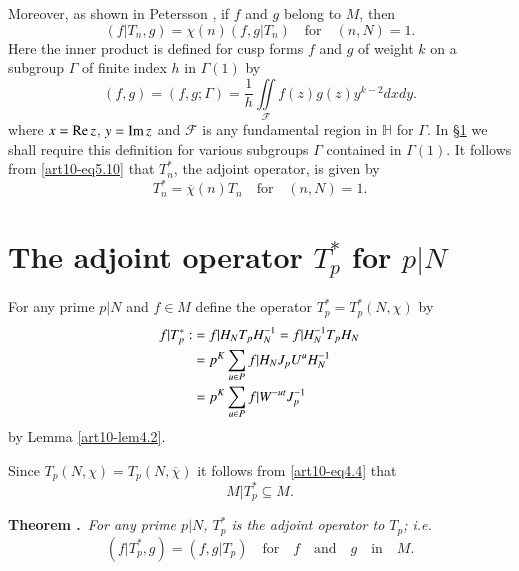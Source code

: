 Moreover, as shown in Petersson \cite{art10-key8}, if $f$ and $g$ belong to $M$, then
\begin{equation}
(f|T_{n},g)=\chi(n)(f,g|T_{n})\text{~~ for~~ } (n,N)=1.\label{art10-eq5.10}
\end{equation}
Here the inner product is defined for cusp forms $f$ and $g$ of weight $k$ on a subgroup $\Gamma$ of finite index $h$ in $\Gamma(1)$ by
\begin{equation}
(f,g)=(f,g;\Gamma)=\frac{1}{h}\iint\limits_{\mathscr{F}}f(z)g(z)y^{k-2}dxdy.\label{art10-eq5.11}
\end{equation}
where $x=\operatorname{Re} z$, $y=\operatorname{Im} z$ and $\mathscr{F}$ is any fundamental region in $\mathbb{H}$ for $\Gamma$. In \S\ref{art10-sec6} we shall require this definition for various subgroups $\Gamma$ contained in $\Gamma(1)$. It follows from \eqref{art10-eq5.10} that $T^{*}_{n}$, the adjoint operator, is given by 
\begin{equation}
T^{*}_{n}=\overline{\chi}(n)T_{n}\text{~~ for~~ } (n,N)=1.\label{art10-eq5.12}
\end{equation}

\section{The adjoint operator $T^{*}_{p}$ for $p|N$}\label{art10-sec6}
For any prime $p|N$ and $f\in M$ define the operator $T^{*}_{p}=T^{*}_{p}(N,\chi)$ by
\setcounter{equation}{0}
\begin{align}
f|T^{*}_{p}: &= f|H_{N}T_{p}H_{N}^{-1}=f|H_{N}^{-1}T_{p}H_{N}\label{art10-eq6.1}\\
            &= p^{K}\sum\limits_{u\in P}f|H_{N}J_{p}U^{u}H^{-1}_{N}\notag\\
            &= p^{K}\sum\limits_{u\in P}f|W^{-ut}J^{-1}_{p}\label{art10-eq6.2}
\end{align}
by Lemma \ref{art10-lem4.2}.

Since $T_{p}(N,\chi)=T_{p}(N,\overline{\chi})$ it follows from \eqref{art10-eq4.4} that
\begin{equation}
M|T^{*}_{p}\subseteq M.\label{art10-eq6.3}
\end{equation}

\medskip
\noindent
{\bf Theorem .\label{art10-thm6.1}}~{\em For any prime $p|N$, $T^{*}_{p}$ is the adjoint operator to $T_{p}$; i.e.}
\begin{equation}
(f|T^{*}_{p},g)=(f,g|T_{p})\text{~~ for~~ } f\text{~~ and~~ } g\text{~~ in~~ }M.\label{art10-eq6.4}
\end{equation}

